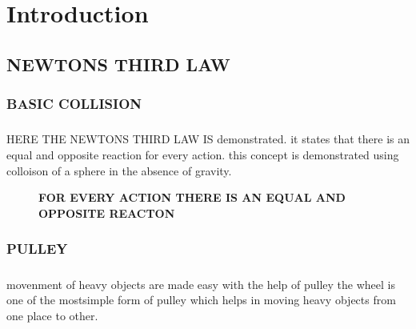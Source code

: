 \chapter{Introduction}
\section{NEWTONS THIRD LAW}
\subsection{BASIC COLLISION}
\paragraph{}HERE THE NEWTONS THIRD LAW IS demonstrated. it states that there is an equal and opposite reaction for every action. this concept is demonstrated using colloison of a sphere in the absence of gravity. 

\begin{figure}[H]
  \centering
    
  \caption{\textbf{FOR EVERY ACTION THERE IS AN EQUAL AND OPPOSITE REACTON}}
\end{figure}

\subsection{PULLEY }
\paragraph{}movenment of heavy objects are made easy with the help of pulley the wheel is one of the mostsimple form of pulley which helps in moving heavy objects from one place to other.
